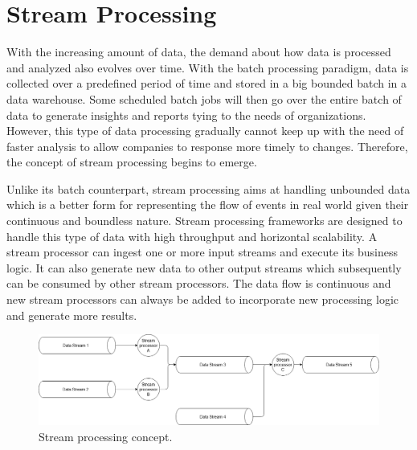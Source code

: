 \section{Stream Processing} \label{section:eventstreamprocessing}
With the increasing amount of data, the demand about how data is processed and analyzed also evolves over time. With the batch processing paradigm, data is collected over a predefined period of time and stored in a big bounded batch in a data warehouse. Some scheduled batch jobs will then go over the entire batch of data to generate insights and reports tying to the needs of organizations. However, this type of data processing gradually cannot keep up with the need of faster analysis to allow companies to response more timely to changes. Therefore, the concept of stream processing begins to emerge.


Unlike its batch counterpart, stream processing aims at handling unbounded data which is a better form for representing the flow of events in real world given their continuous and boundless nature. Stream processing frameworks are designed to handle this type of data with high throughput and horizontal scalability. A stream processor can ingest one or more input streams and execute its business logic. It can also generate new data to other output streams which subsequently can be consumed by other stream processors. The data flow is continuous and new stream processors can always be added to incorporate new processing logic and generate more results.

\begin{figure}[h]
	\includegraphics[width=\linewidth]{images/streamprocessing.png}
	\caption{Stream processing concept.}
	\label{fig:streamprocessing}
\end{figure}



